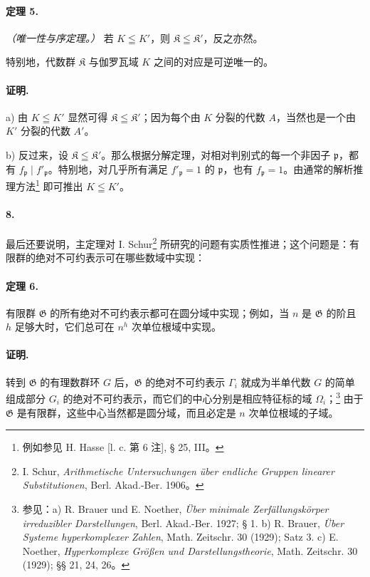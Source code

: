 \paragraph{定理 5.}
\emph{（唯一性与序定理。）} 若 \(K\leqq K'\)，则 \(\mathfrak K\leqq\mathfrak K'\)，反之亦然。

特别地，代数群 \(\mathfrak K\) 与伽罗瓦域 \(K\) 之间的对应是可逆唯一的。

\paragraph{证明.}
a) 由 \(K\leqq K'\) 显然可得 \(\mathfrak K\leqq\mathfrak K'\)；因为每个由 \(K\) 分裂的代数 \(A\)，当然也是一个由 \(K'\) 分裂的代数 \(A'\)。

b) 反过来，设 \(\mathfrak K\leqq\mathfrak K'\)。那么根据分解定理，对相对判别式的每一个非因子 \(\mathfrak p\)，都有 \(f_{\mathfrak p}\mid f'_{\mathfrak p}\)。特别地，对几乎所有满足 \(f'_{\mathfrak p}=1\) 的 \(\mathfrak p\)，也有 \(f_{\mathfrak p}=1\)。由通常的解析推理方法\footnote{例如参见 H. Hasse [l. c. 第 6 注], § 25, III。} 即可推出 \(K\leqq K'\)。

\paragraph{8.}
最后还要说明，主定理对 I. Schur\footnote{I. Schur, \emph{Arithmetische Untersuchungen über endliche Gruppen linearer Substitutionen}, Berl. Akad.-Ber. 1906。} 所研究的问题有实质性推进；这个问题是：有限群的绝对不可约表示可在哪些数域中实现：

\paragraph{定理 6.}
有限群 \(\mathfrak G\) 的所有绝对不可约表示都可在圆分域中实现；例如，当 \(n\) 是 \(\mathfrak G\) 的阶且 \(h\) 足够大时，它们总可在 \(n^h\) 次单位根域中实现。

\paragraph{证明.}
转到 \(\mathfrak G\) 的有理数群环 \(G\) 后，\(\mathfrak G\) 的绝对不可约表示 \(\Gamma_i\) 就成为半单代数 \(G\) 的简单组成部分 \(G_i\) 的绝对不可约表示，而它们的中心分别是相应特征标的域 \(\Omega_i\)；\footnote{参见：a) R. Brauer und E. Noether, \emph{Über minimale Zerfällungskörper irreduzibler Darstellungen}, Berl. Akad.-Ber. 1927; § 1. b) R. Brauer, \emph{Über Systeme hyperkomplexer Zahlen}, Math. Zeitschr. 30 (1929); Satz 3. c) E. Noether, \emph{Hyperkomplexe Größen und Darstellungstheorie}, Math. Zeitschr. 30 (1929); §§ 21, 24, 26。} 由于 \(\mathfrak G\) 是有限群，这些中心当然都是圆分域，而且必定是 \(n\) 次单位根域的子域。

